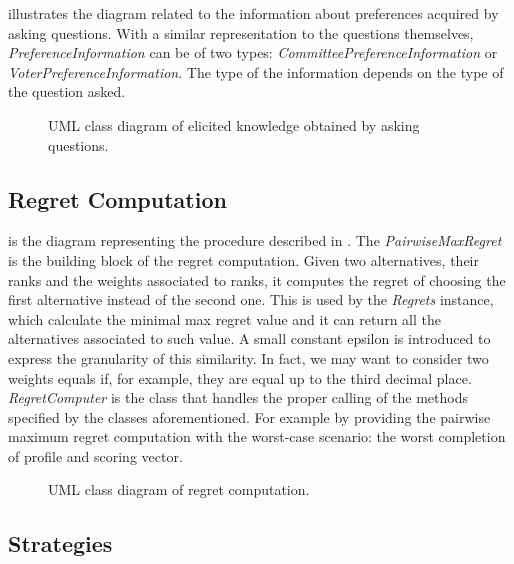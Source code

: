  illustrates the diagram related to the information about preferences acquired by asking questions. With a similar representation to the questions themselves, \textit{PreferenceInformation} can be of two types: \textit{CommitteePreferenceInformation} or \textit{VoterPreferenceInformation}. The type of the information depends on the type of the question asked.

\begin{figure}
	\centering
	
	\caption{UML class diagram of elicited knowledge obtained by asking questions.}
	\label{uml:prefinfo}
\end{figure}

\pagebreak

\subsection{Regret Computation}
 is the diagram representing the procedure described in . The \textit{PairwiseMaxRegret} is the building block of the regret computation. Given two alternatives, their ranks and the weights associated to ranks, it computes the regret of choosing the first alternative instead of the second one. This is used by the \textit{Regrets} instance, which calculate the minimal max regret value and it can return all the alternatives associated to such value. A small constant epsilon is introduced to express the granularity of this similarity. In fact, we may want to consider two weights equals if, for example, they are equal up to the third decimal place. \textit{RegretComputer} is the class that handles the proper calling of the methods specified by the classes aforementioned. For example by providing the pairwise maximum regret computation with the worst-case scenario: the worst completion of profile and scoring vector.


\begin{figure}
	\centering
	
	\caption{UML class diagram of regret computation.}
	\label{uml:regret}
\end{figure}


\subsection{Strategies}

